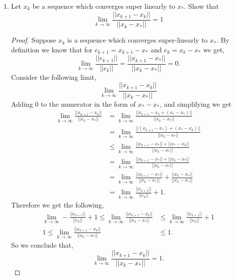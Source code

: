 \documentclass[12pt]{article}
\makeatletter
\theoremstyle{homework}
\newenvironment{exercise}[1]
{\def\@currentlabel{#1}\exercisecore}
{\endexercisecore}
\makeatother
\begin{document}
\begin{exercise}{P15} 
  \begin{enumerate}
    \item[(a)] Let ${x_k}$ be a sequence which converges super linearly to $x_*$. Show that
    \begin{equation*}
      \lim_{k \to \infty} \frac{||x_{k + 1} - x_k||}{||x_k - x_*||} = 1
    \end{equation*}
    \begin{proof} Suppose ${x_k}$ is a sequence which converges super-linearly to $x_*$. By definition we know that 
      for $e_{k + 1} = x_{k + 1} - x_*$ and $e_{k} = x_{k} - x_*$ we get, 
      \begin{equation*}
      \lim_{k \to \infty} \frac{||e_{k + 1}||}{||e_k||} = \frac{||x_{k + 1} - x_*||}{||x_{k} - x_*||} = 0.
      \end{equation*}
      Consider the following limit,
      \begin{equation*}
        \lim_{k \to \infty} \frac{||x_{k + 1} - x_k||}{||x_k - x_*||}
      \end{equation*}
      Adding $0$ to the numerator in the form of $x_* - x_*$, and simplifying we get
      \begin{align*}
        \lim_{k \to \infty} \frac{||x_{k + 1} - x_k||}{||x_k - x_*||} &=  \lim_{k \to \infty} \frac{||x_{k + 1} - x_k + (x_* - x_*)||}{||x_k - x_*||}\\
        &=  \lim_{k \to \infty} \frac{||(x_{k + 1} - x_*) + (x_* - x_k)||}{||x_k - x_*||}\\
        &\leq  \lim_{k \to \infty} \frac{||x_{k + 1} - x_*|| + ||x_* - x_k||}{||x_k - x_*||}\\
        &=  \lim_{k \to \infty} \frac{||x_{k + 1} - x_*|| + ||x_k - x_*||}{||x_k - x_*||}\\
        &=  \lim_{k \to \infty} \frac{||x_{k + 1} - x_*||}{||x_k - x_*||} + \frac{||x_k - x_*||}{||x_k - x_*||}\\
        &=  \lim_{k \to \infty} \frac{||e_{k + 1}||}{||e_k||} + 1.
      \end{align*}
      Therefore we get the following, 
      \begin{align*}
        \lim_{k \to \infty} -\frac{||e_{k + 1}||}{||e_k||} + 1 \leq \lim_{k \to \infty} \frac{||x_{k + 1} - x_k||}{||x_k - x_*||} &\leq  \lim_{k \to \infty} \frac{||e_{k + 1}||}{||e_k||} + 1\\
         1 \leq \lim_{k \to \infty} \frac{||x_{k + 1} - x_k||}{||x_k - x_*||} &\leq 1.
      \end{align*}
      So we conclude that,
      \begin{equation*}
        \lim_{k \to \infty} \frac{||x_{k + 1} - x_k||}{||x_k - x_*||} = 1.
      \end{equation*}


\end{proof}
\end{enumerate}
\end{exercise}
\end{document}

